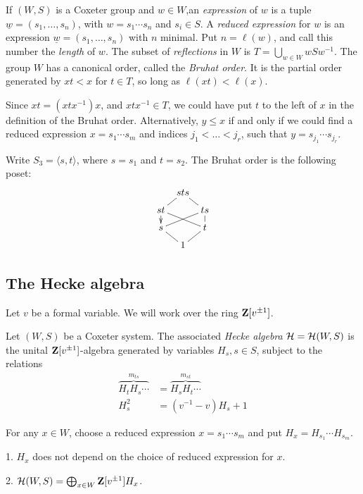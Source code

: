 \documentclass{article}
\begin{document}
If $(W,S)$ is a Coxeter group and $w\in W$,an \emph{expression} of $w$ is a tuple 
$\underline w = (s_1,\dots,s_n)$, with $w=s_1\dotsm s_n$ and $s_i\in S$. A 
\emph{reduced expression} for $w$ is an expression $\underline w = (s_1,\dots,s_n)$ 
with $n$ minimal. Put $n=\ell(w)$, and call this number the \emph{length} of 
$w$. The subset of \emph{reflections} in $W$ is 
$T=\bigcup_{w\in W} w S w^{-1}$. The group $W$ has a canonical order, called the 
\emph{Bruhat order}. It is the partial order generated by 
$x t<x$ for $t\in T$, so long as 
$\ell(x t) < \ell(x)$. 

Since $x t=(x t x^{-1}) x$, and $x t x^{-1}\in T$, we could have put $t$ to the 
left of $x$ in the definition of the Bruhat order. Alternatively, 
$y\leqslant x$ if and only if we could find a reduced expression 
$x=s_1\dotsm s_m$ and indices $j_1<\dots<j_r$, such that 
$y=s_{j_1} \dotsm s_{j_r}$. 

\begin{example}
Write $S_3=\langle s,t\rangle$, where $s=s_1$ and $t=s_2$. The Bruhat order is 
the following poset:
\[\xymatrix@=.2cm{
  & s t s \ar@{-}[dr] \ar@{-}[dl] \\
  s t \ar@{->}[d] \ar@{-}[drr] & & t s \ar@{-}[dll] \ar@{-}[d] \\
  s \ar@{-}[dr] & & t \ar@{-}[dl] \\
  & 1
}\]
\end{example}


\subsection{The Hecke algebra}

Let $v$ be a formal variable. We will work over the ring 
$\mathbf{Z}[v^{\pm 1}]$. 

\begin{definition}
Let $(W,S)$ be a Coxeter system. The associated \emph{Hecke algebra} 
$\mathcal{H}=\mathcal{H}(W,S)$ is the unital $\mathbf{Z}[v^{\pm 1}]$-algebra generated by variables 
$H_s,s\in S$, subject to the relations 
\begin{align*}
  \overbrace{H_t H_s \dotsm }^{m_{t s}} &= \overbrace{H_s H_t \dotsm}^{m_{s t}} \\
  H_s^2 &= (v^{-1} - v) H_s + 1
\end{align*}
\end{definition}
For any $x\in W$, choose a reduced expression 
$x=s_1\dotsm s_m$ and put $H_x = H_{s_1} \dotsm H_{s_m}$. 

\begin{theorem}[Tits]
1. $H_x$ does not depend on the choice of reduced expression for $x$. 

2. $\mathcal{H}(W,S)=\bigoplus_{x\in W} \mathbf{Z}[v^{\pm 1}] H_x$. 
\end{theorem}
\end{document}
